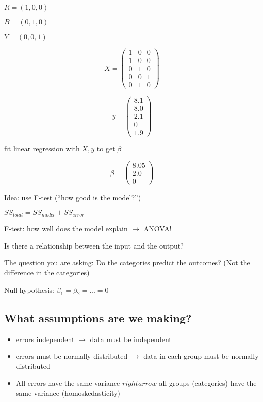 \documentclass[twoside]{article}
\begin{document}
$R = ( 1, 0, 0 )$

$B = ( 0, 1, 0 )$

$Y = ( 0, 0, 1 )$

\[ X = \left( 
\begin{array}{ccc}
1 & 0 & 0 \\
1 & 0 & 0 \\
0 & 1 & 0 \\
0 & 0 & 1 \\
0 & 1 & 0  \end{array}
\right) \]

\[ y = \left( 
\begin{array}{c}
8.1 \\
8.0 \\
2.1 \\
0 \\
1.9  \end{array}
\right) \]


fit linear regression with $X, y$ to get $\beta$

\[ \beta = \left( 
\begin{array}{c}
8.05 \\
2.0 \\
0   \end{array}
\right) \]

Idea: use F-test (``how good is the model?'')

$SS_{total} = SS_{model} + SS_{error}$ 

F-test: how well does the model explain $\rightarrow$ ANOVA!

Is there a relationship between the input and the output?

The question you are asking: Do the categories predict the outcomes? (Not the difference in the categories)

Null hypothesis: $\beta_1 = \beta_2 = ... = 0$

\subsection{What assumptions are we making?}

\begin{itemize}
\item errors independent $\rightarrow$ data must be independent
\item errors must be normally distributed $\rightarrow$ data in each group must be normally distributed
\item All errors have the same variance $rightarrow$ all groups (categories) have the same variance (homoskedasticity)
\end{itemize}
\end{document}
